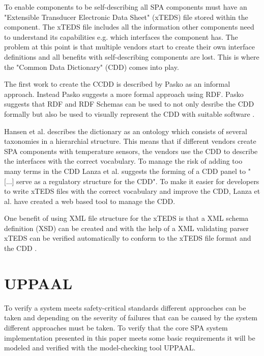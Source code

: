 
To enable components to be self-describing all SPA components must have an
"Extensible Transducer Electronic Data Sheet" (xTEDS) file stored within the
component. The xTEDS file includes all the information other components need to
understand its capabilities e.g. which interfaces the component has. The
problem at this point is that multiple vendors start to create their own
interface definitions and all benefits with self-describing components are
lost. This is where the "Common Data Dictionary" (CDD) comes into play.


The first work to create the CCDD is described by Pasko as an informal
approach.  Instead Pasko suggests a more formal approach using RDF. Pasko
suggests that RDF and RDF Schemas can be used to not only desribe the CDD
formally but also be used to visually represent the CDD with suitable software
\cite{pasko2011}.

Hansen et al. \cite{hansen2012} describes the dictionary as an ontology which
consists of several taxonomies in a hierarchial structure. This means that if
different vendors create SPA components with temperature sensors, the vendors
use the CDD to describe the interfaces with the correct vocabulary. To manage
the risk of adding too many terms in the CDD Lanza et al. \cite{lanza2010}
suggests the forming of a CDD panel to "[...] serve as a regulatory structure
for the CDD". To make it easier for developers to write xTEDS files with the
correct vocabulary and improve the CDD, Lanza et al.  \cite{lanza2010} have
created a web based tool to manage the CDD.

One benefit of using XML file structure for the xTEDS is that a XML schema
definition (XSD) can be created and with the help of a XML validating parser
xTEDS can be verified automatically to conform to the xTEDS file format and the
CDD \cite{lanza2010}.


\section{UPPAAL}
To verify a system meets safety-critical standards different approaches can
be taken and depending on the severity of failures that can be caused by the
system different approaches must be taken. To verify that the core SPA system
implementation presented in this paper meets some basic requirements it will be
modeled and verified with the model-checking tool UPPAAL.

